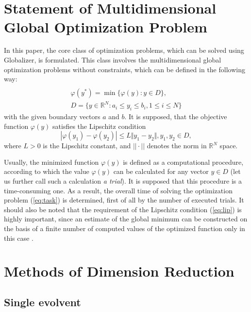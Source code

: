 \documentclass[runningheads]{llncs}
\begin{document}
\section{Statement of Multidimensional Global Optimization Problem}
In this paper, the core class of optimization problems, which can be solved using
Globalizer\cite{globalizerSystem}, is formulated. This class involves the multidimensional global
optimization problems without constraints, which can be defined in the following way:
\begin{equation}
\label{eq:task}
\begin{array}{cr}\\
  \varphi(y^*)=\min\{\varphi(y):y\in D\}, \\
  D=\{y\in \mathbb{R}^N:a_i\leq y_i\leq{b_i}, 1\leq{i}\leq{N}\}
\end{array}
\end{equation}
with the given boundary vectors  $a$ and  $b$. It is supposed, that the objective function \(\varphi(y)\) satisfies the Lipschitz condition
\begin{equation}
\label{eq:lip}
|\varphi(y_1)-\varphi(y_2)|\leq L\Vert y_1-y_2\Vert,y_1,y_2\in D,
\end{equation}
where \(L>0\) is the Lipschitz constant, and \(||\cdot||\) denotes the norm in \(\mathbb{R}^N\) space.
\par
Usually, the minimized function \(\varphi(y)\) is defined as a computational procedure,
according to which the value \(\varphi(y)\) can be calculated for any vector \(y\in D\)
(let us further call such a calculation \textit{a trial}). It is supposed that this procedure
is a time-consuming one. As a result, the overall time of solving the optimization
problem (\ref{eq:task}) is determined, first of all by the number of executed trials.
It should also be noted that the requirement of the Lipschitz condition (\ref{eq:lip})
is highly important, since an estimate of the global minimum can be constructed on the
basis of a finite number of computed values of the optimized function only in this case .

\section{Methods of Dimension Reduction}
\subsection{Single evolvent}
\end{document}
